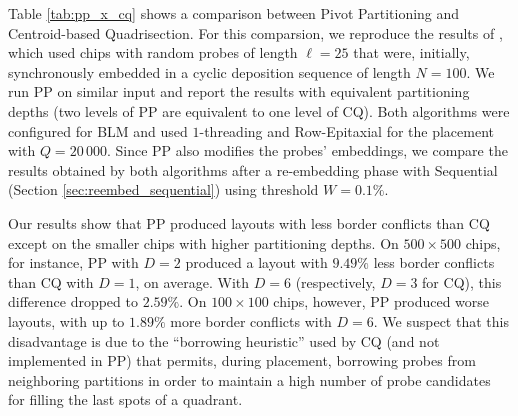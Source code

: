 Table \ref{tab:pp_x_cq} shows a comparison between Pivot Partitioning and
Centroid-based Quadrisection. For this comparsion, we reproduce the results of
\citet{Kahng2003a}, which used chips with random probes of length $\ell=25$ that
were, initially, synchronously embedded in a cyclic deposition sequence of
length $N=100$. We run PP on similar input and report the results with
equivalent partitioning depths (two levels of PP are equivalent to one level of
CQ). Both algorithms were configured for BLM and used $1$-threading and
Row-Epitaxial for the placement with $Q = 20\,000$. Since PP also modifies the
probes' embeddings, we compare the results obtained by both algorithms after a
re-embedding phase with Sequential (Section \ref{sec:reembed_sequential}) using
threshold $W=0.1\%$.

Our results show that PP produced layouts with less border conflicts than CQ
except on the smaller chips with higher partitioning depths. On $500\times 500$
chips, for instance, PP with $D=2$ produced a layout with $9.49\%$ less border
conflicts than CQ with $D=1$, on average. With $D=6$ (respectively, $D=3$ for
CQ), this difference dropped to $2.59\%$. On $100\times 100$ chips, however, PP
produced worse layouts, with up to $1.89\%$ more border conflicts with $D=6$.
We suspect that this disadvantage is due to the ``borrowing heuristic'' used by
CQ (and not implemented in PP) that permits, during placement, borrowing probes
from neighboring partitions in order to maintain a high number of probe
candidates for filling the last spots of a quadrant.

